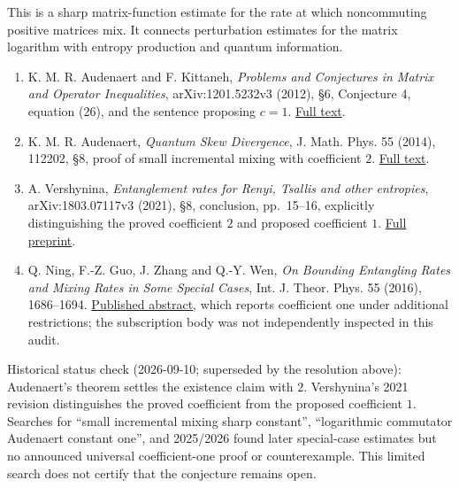 \documentclass[11pt,a4paper]{article}
\makeatletter
\renewcommand{\subsection}{\Needspace{4\baselineskip}\@startsection{subsection}{2}{0pt}{9pt plus 1pt minus 1pt}{3pt}{\sffamily\bfseries\normalsize\color{ink}}}
\makeatother
\begin{document}
This is a sharp matrix-function estimate for the rate at which
noncommuting positive matrices mix. It connects perturbation estimates
for the matrix logarithm with entropy production and quantum
information.

\subsection{References}\label{references}

\begin{enumerate}
\def\labelenumi{\arabic{enumi}.}
\item
  K. M. R. Audenaert and F. Kittaneh, \emph{Problems and Conjectures in
  Matrix and Operator Inequalities}, arXiv:1201.5232v3 (2012), §6,
  Conjecture 4, equation (26), and the sentence proposing \(c=1\).
  \href{https://arxiv.org/html/1201.5232}{Full text}.
\item
  K. M. R. Audenaert, \emph{Quantum Skew Divergence}, J. Math. Phys. 55
  (2014), 112202, §8, proof of small incremental mixing with coefficient
  \(2\). \href{https://arxiv.org/html/1304.5935}{Full text}.
\item
  A. Vershynina, \emph{Entanglement rates for Renyi, Tsallis and other
  entropies}, arXiv:1803.07117v3 (2021), §8, conclusion, pp.~15--16,
  explicitly distinguishing the proved coefficient \(2\) and proposed
  coefficient \(1\). \href{https://arxiv.org/pdf/1803.07117}{Full
  preprint}.
\item
  Q. Ning, F.-Z. Guo, J. Zhang and Q.-Y. Wen, \emph{On Bounding
  Entangling Rates and Mixing Rates in Some Special Cases}, Int. J.
  Theor. Phys. 55 (2016), 1686--1694.
  \href{https://doi.org/10.1007/s10773-015-2806-9}{Published abstract},
  which reports coefficient one under additional restrictions; the
  subscription body was not independently inspected in this audit.
\end{enumerate}

Historical status check (2026-09-10; superseded by the resolution
above): Audenaert's theorem settles the existence claim with \(2\).
Vershynina's 2021 revision distinguishes the proved coefficient from the
proposed coefficient \(1\). Searches for ``small incremental mixing
sharp constant'', ``logarithmic commutator Audenaert constant one'', and
2025/2026 found later special-case estimates but no announced universal
coefficient-one proof or counterexample. This limited search does not
certify that the conjecture remains open.
\end{document}
